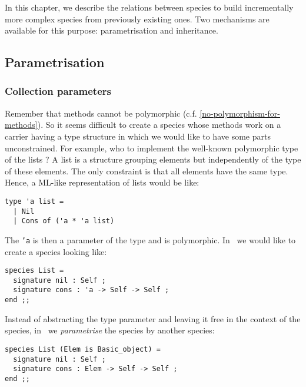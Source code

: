 


In this chapter, we describe the relations between species to build
incrementally more complex species from previously existing ones. Two
mechanisms are available for this purpose: parametrisation and
inheritance.



\subsection{Parametrisation}
\label{parametrisation}


\subsubsection{Collection parameters}
\label{collection-parameter}
Remember that methods cannot be polymorphic
(c.f. \ref{no-polymorphism-for-methods}). So it seems difficult to
create a species whose methods work on a carrier having a type
structure in which we would like to have some parts unconstrained. For
example, who to implement the well-known polymorphic type of the
lists ? A list is a structure grouping elements but independently of
the type of these elements. The only constraint is that all elements
have the same type. Hence, a ML-like representation of lists would be
like:
{\scriptsize
\lstset{language=Caml}
\begin{lstlisting}
type 'a list =
  | Nil
  | Cons of ('a * 'a list)
\end{lstlisting}
}

The {\tt 'a} is then a parameter of the type and is polymorphic.
In \focal\ we would like to create a species looking like:
{\scriptsize
\begin{lstlisting}
species List =
  signature nil : Self ;
  signature cons : 'a -> Self -> Self ;
end ;;
\end{lstlisting}
}

Instead of abstracting the type parameter and leaving it free in the
context of the species, in \focal\ we {\em parametrise} the species
by another species:
{\scriptsize
\begin{lstlisting}
species List (Elem is Basic_object) =
  signature nil : Self ;
  signature cons : Elem -> Self -> Self ;
end ;;
\end{lstlisting}
}

